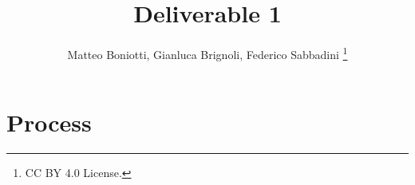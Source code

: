 \documentclass[
letterpaper,
10pt,
unnumberedsections,
twoside
]{LTJournalArticle}
\title{Deliverable 1}
\author{
	Matteo Boniotti, Gianluca Brignoli, Federico Sabbadini
	\thanks{
		CC BY 4.0 License.
	}
}
\begin{document}
	
	\maketitle
	\newpage
	
	\section{Process}
		
	
	\printbibliography
	
\end{document}
